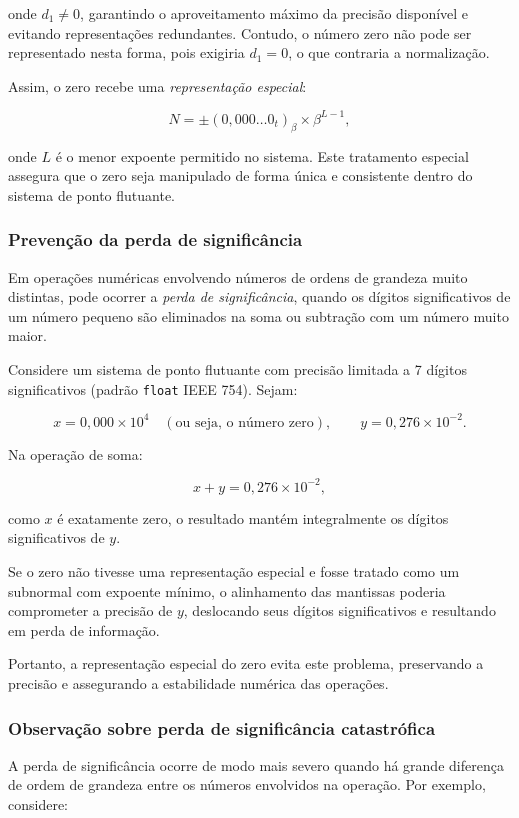 onde \( d_1 \neq 0 \), garantindo o aproveitamento máximo da precisão disponível e evitando representações redundantes. Contudo, o número zero não pode ser representado nesta forma, pois exigiria \( d_1 = 0 \), o que contraria a normalização. 

Assim, o zero recebe uma \textit{representação especial}:

\[
N = \pm (0{,}000\ldots 0_{t})_\beta \times \beta^{L - 1},
\]

onde \( L \) é o menor expoente permitido no sistema. Este tratamento especial assegura que o zero seja manipulado de forma única e consistente dentro do sistema de ponto flutuante.

\subsubsection*{Prevenção da perda de significância}

Em operações numéricas envolvendo números de ordens de grandeza muito distintas, pode ocorrer a \textit{perda de significância}, quando os dígitos significativos de um número pequeno são eliminados na soma ou subtração com um número muito maior.

Considere um sistema de ponto flutuante com precisão limitada a 7 dígitos significativos (padrão \texttt{float} IEEE 754). Sejam:

\[
x = 0{,}000 \times 10^4 \quad (\text{ou seja, o número zero}), \qquad y = 0{,}276 \times 10^{-2}.
\]

Na operação de soma:

\[
x + y = 0{,}276 \times 10^{-2},
\]

como \( x \) é exatamente zero, o resultado mantém integralmente os dígitos significativos de \( y \).

Se o zero não tivesse uma representação especial e fosse tratado como um subnormal com expoente mínimo, o alinhamento das mantissas poderia comprometer a precisão de \( y \), deslocando seus dígitos significativos e resultando em perda de informação. 

Portanto, a representação especial do zero evita este problema, preservando a precisão e assegurando a estabilidade numérica das operações.

\subsubsection*{Observação sobre perda de significância catastrófica}

A perda de significância ocorre de modo mais severo quando há grande diferença de ordem de grandeza entre os números envolvidos na operação. Por exemplo, considere:

